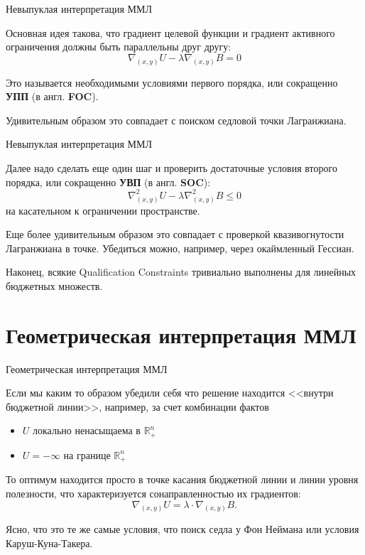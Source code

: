 \documentclass{beamer}
\begin{document}
\begin{frame}{Невыпуклая интерпретация ММЛ}


Основная идея такова, что градиент целевой функции и градиент активного ограничения должны быть параллельны друг другу:
$$ \nabla_{(x,y)}U - \lambda \nabla_{(x,y)} B = 0$$

Это называется необходимыми условиями первого порядка, или сокращенно \textbf{УПП} (в англ. \textbf{FOC}). 

Удивительным образом это совпадает с поиском седловой точки Лагранжиана.

\end{frame}

\begin{frame}{Невыпуклая интерпретация ММЛ}

Далее надо сделать еще один шаг и проверить достаточные условия второго порядка, или сокращенно \textbf{УВП} (в англ. \textbf{SOC}):
$$ \nabla^2_{(x,y)}U - \lambda \nabla^2_{(x,y)} B \leqslant 0$$
на касательном к ограничении пространстве. 

Еще более удивительным образом это совпадает с проверкой квазивогнутости Лагранжиана в точке. Убедиться можно, например, через окаймленный Гессиан.

Наконец, всякие Qualification Constraints тривиально выполнены для линейных бюджетных множеств.

\end{frame}

\section{Геометрическая интерпретация ММЛ}

\begin{frame}{Геометрическая интерпретация ММЛ}

Если мы каким то образом убедили себя что решение находится <<внутри бюджетной линии>>, например, за счет комбинации фактов

\begin{itemize}
  \item $U$ локально ненасыщаема в $\mathbb{R}^n_+$
  \item $U = -\infty$ на границе $\mathbb{R}^n_+$
\end{itemize}

То оптимум находится просто \alert{в точке касания} бюджетной линии и линии уровня полезности, что характеризуется сонаправленностью их градиентов:
$$ \nabla_{(x,y)} U = \lambda \cdot \nabla_{(x,y)} B.$$

Ясно, что это те же самые условия, что поиск седла у Фон Неймана или условия Каруш-Куна-Такера.

\end{frame}
\end{document}

